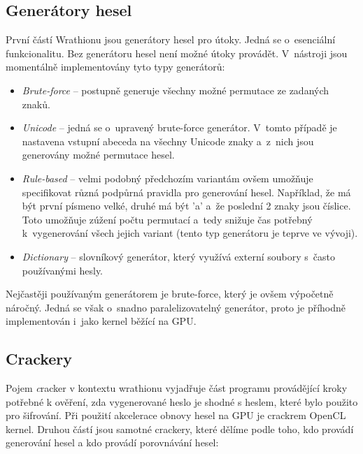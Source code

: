 \subsection{Generátory hesel}
První částí Wrathionu jsou generátory hesel pro útoky. Jedná se o~esenciální
funkcionalitu. Bez generátoru hesel není možné útoky provádět. V~nástroji jsou momentálně
implementovány tyto typy generátorů:
\begin{itemize}
    \item {\it Brute-force} -- postupně generuje všechny možné permutace ze zadaných znaků.
    \item {\it Unicode} -- jedná se o~upravený brute-force generátor. V~tomto případě je nastavena
	vstupní abeceda na všechny Unicode znaky a~z~nich jsou generovány možné permutace hesel.
    \item {\it Rule-based} -- velmi podobný předchozím variantám ovšem umožňuje specifikovat různá
	podpůrná pravidla pro generování hesel. Například, že má být první písmeno velké, druhé má
	být 'a' a~že poslední 2 znaky jsou číslice. Toto umožňuje zúžení počtu permutací a~tedy
	snižuje čas potřebný k~vygenerování všech jejich variant (tento typ generátoru je teprve
	ve vývoji).
    \item {\it Dictionary} -- slovníkový generátor, který využívá externí soubory s~často
	používanými hesly.
\end{itemize}
Nejčastěji používaným generátorem je brute-force, který je ovšem výpočetně náročný. Jedná se
však o~snadno paralelizovatelný generátor, proto je příhodně implementován i~jako kernel běžící na
GPU.
\subsection{Crackery}
Pojem {\textit cracker} v kontextu wrathionu vyjadřuje část programu provádějící kroky potřebné k
ověření, zda vygenerované heslo je shodné s heslem, které bylo použito pro šifrování. Při použití
akcelerace obnovy hesel na GPU je crackrem OpenCL kernel.
Druhou částí jsou samotné crackery, které dělíme podle toho, kdo provádí generování hesel a
kdo provádí porovnávání hesel:
